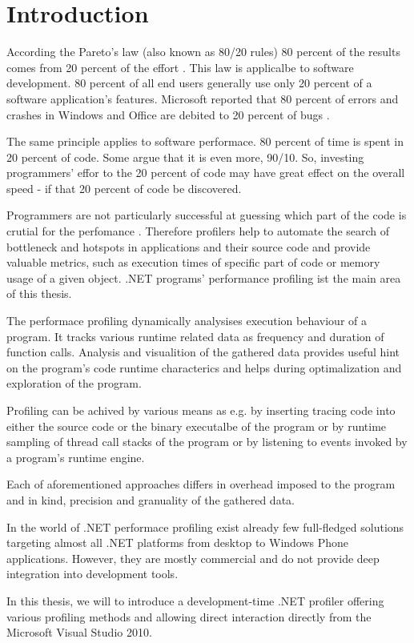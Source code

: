 \chapter{Introduction}

According the Pareto's law (also known as 80/20 rules) 80 percent of the results comes from 20 percent of the effort \cite{RicKoch1999}. This law is applicalbe to software development. 80 percent of all end users generally use only 20 percent of a software application's features. Microsoft reported that 80 percent of errors and crashes in Windows and Office are debited to 20 percent of bugs \cite{PauRoon2002}.

The same principle applies to software performace. 80 percent of time is spent in 20 percent of code. Some argue that it is even more, 90/10. So, investing programmers' effor to the 20 percent of code may have great effect on the overall speed - if that 20 percent of code be discovered.

Programmers are not particularly successful at guessing which part of the code is crutial for the perfomance \cite{SteMcCo2004}. Therefore profilers help to automate the search of bottleneck and hotspots in applications and their source code and provide valuable metrics, such as execution times of specific part of code or memory usage of a given object. .NET programs' performance profiling ist the main area of this thesis.

The performace profiling dynamically analysises execution behaviour of a program. It tracks various runtime related data as frequency and duration of function calls. Analysis and visualition of the gathered data provides useful hint on the program's code runtime characterics and helps during optimalization and exploration of the program.
	
Profiling can be achived by various means as e.g. by inserting tracing code into either the source code or the binary executalbe of the program or by runtime sampling of thread call stacks of the program or by listening to events invoked by a program's runtime engine.

Each of aforementioned approaches differs in overhead imposed to the program and in kind, precision and granuality of the gathered data.

In the world of .NET performace profiling exist already few full-fledged solutions targeting almost all .NET platforms from desktop to Windows Phone applications. However, they are mostly commercial and do not provide deep integration into development tools.  

In this thesis, we will to introduce a development-time .NET profiler offering various profiling methods and allowing direct interaction directly from the Microsoft Visual Studio 2010.